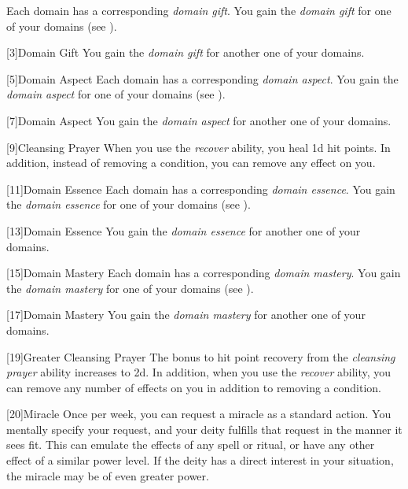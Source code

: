         Each domain has a corresponding \textit{domain gift}.
        You gain the \textit{domain gift} for one of your domains (see ).

        [3]{Domain Gift}
        You gain the \textit{domain gift} for another one of your domains.

        [5]{Domain Aspect}
        Each domain has a corresponding \textit{domain aspect}.
        You gain the \textit{domain aspect} for one of your domains (see ).

        [7]{Domain Aspect} 
        You gain the \textit{domain aspect} for another one of your domains.

        [9]{Cleansing Prayer}
        When you use the \textit{recover} ability, you heal \plus1d hit points.
        In addition, instead of removing a condition, you can remove any  effect on you.

        [11]{Domain Essence}
        Each domain has a corresponding \textit{domain essence}.
        You gain the \textit{domain essence} for one of your domains (see ).

        [13]{Domain Essence} 
        You gain the \textit{domain essence} for another one of your domains.

        [15]{Domain Mastery}
        Each domain has a corresponding \textit{domain mastery}.
        You gain the \textit{domain mastery} for one of your domains (see ).

        [17]{Domain Mastery} 
        You gain the \textit{domain mastery} for another one of your domains.

        [19]{Greater Cleansing Prayer} 
        The bonus to hit point recovery from the \textit{cleansing prayer} ability increases to \plus2d.
        In addition, when you use the \textit{recover} ability, you can remove any number of  effects on you in addition to removing a condition.

        [20]{Miracle}
        Once per week, you can request a miracle as a standard action.
        You mentally specify your request, and your deity fulfills that request in the manner it sees fit.
        This can emulate the effects of any spell or ritual, or have any other effect of a similar power level.
        If the deity has a direct interest in your situation, the miracle may be of even greater power.

